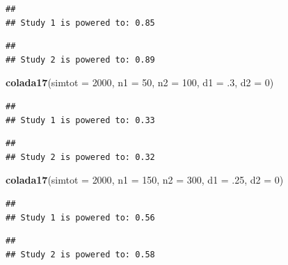 \documentclass[]{book}
\newenvironment{Shaded}{\begin{snugshade}}{\end{snugshade}}
\newcommand{\CommentTok}[1]{\textcolor[rgb]{0.56,0.35,0.01}{\textit{#1}}}
\newcommand{\DataTypeTok}[1]{\textcolor[rgb]{0.13,0.29,0.53}{#1}}
\newcommand{\DecValTok}[1]{\textcolor[rgb]{0.00,0.00,0.81}{#1}}
\newcommand{\FloatTok}[1]{\textcolor[rgb]{0.00,0.00,0.81}{#1}}
\newcommand{\KeywordTok}[1]{\textcolor[rgb]{0.13,0.29,0.53}{\textbf{#1}}}
\newcommand{\NormalTok}[1]{#1}
\newcommand{\OperatorTok}[1]{\textcolor[rgb]{0.81,0.36,0.00}{\textbf{#1}}}
\newcommand{\StringTok}[1]{\textcolor[rgb]{0.31,0.60,0.02}{#1}}
\begin{document}
\begin{verbatim}
## 
## Study 1 is powered to: 0.85
\end{verbatim}

\begin{verbatim}
## 
## Study 2 is powered to: 0.89
\end{verbatim}

\begin{Shaded}
\begin{Highlighting}[]
  \KeywordTok{colada17}\NormalTok{(}\DataTypeTok{simtot =} \DecValTok{2000}\NormalTok{, }\DataTypeTok{n1 =} \DecValTok{50}\NormalTok{, }\DataTypeTok{n2 =} \DecValTok{100}\NormalTok{, }\DataTypeTok{d1 =} \FloatTok{.3}\NormalTok{, }\DataTypeTok{d2 =} \DecValTok{0}\NormalTok{)}
\end{Highlighting}
\end{Shaded}

\begin{verbatim}
## 
## Study 1 is powered to: 0.33
\end{verbatim}

\begin{verbatim}
## 
## Study 2 is powered to: 0.32
\end{verbatim}

\begin{Shaded}
\begin{Highlighting}[]
  \KeywordTok{colada17}\NormalTok{(}\DataTypeTok{simtot =} \DecValTok{2000}\NormalTok{, }\DataTypeTok{n1 =} \DecValTok{150}\NormalTok{, }\DataTypeTok{n2 =} \DecValTok{300}\NormalTok{, }\DataTypeTok{d1 =} \FloatTok{.25}\NormalTok{, }\DataTypeTok{d2 =} \DecValTok{0}\NormalTok{)}
\end{Highlighting}
\end{Shaded}

\begin{verbatim}
## 
## Study 1 is powered to: 0.56
\end{verbatim}

\begin{verbatim}
## 
## Study 2 is powered to: 0.58
\end{verbatim}

\begin{Shaded}
\end{Shaded}
\end{document}
